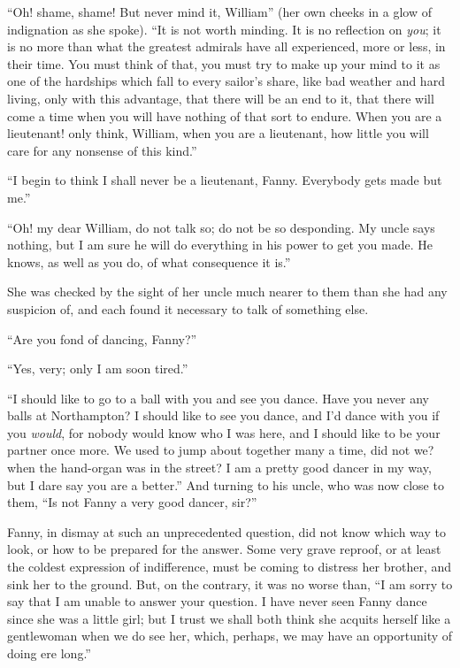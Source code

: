``Oh! shame, shame!  But never mind it, William'' (her own
cheeks in a glow of indignation as she spoke). ``It is not
worth minding.  It is no reflection on \emph{you}; it is no
more than what the greatest admirals have all experienced,
more or less, in their time.  You must think of that,
you must try to make up your mind to it as one of the
hardships which fall to every sailor's share, like bad
weather and hard living, only with this advantage,
that there will be an end to it, that there will come
a time when you will have nothing of that sort to endure.
When you are a lieutenant! only think, William, when you
are a lieutenant, how little you will care for any nonsense
of this kind.''

``I begin to think I shall never be a lieutenant, Fanny.
Everybody gets made but me.''

``Oh! my dear William, do not talk so; do not be so desponding.
My uncle says nothing, but I am sure he will do everything
in his power to get you made.  He knows, as well as you do,
of what consequence it is.''

She was checked by the sight of her uncle much nearer
to them than she had any suspicion of, and each found
it necessary to talk of something else.

``Are you fond of dancing, Fanny?''

``Yes, very; only I am soon tired.''

``I should like to go to a ball with you and see
you dance.  Have you never any balls at Northampton?
I should like to see you dance, and I'd dance with you
if you \emph{would}, for nobody would know who I was here,
and I should like to be your partner once more.
We used to jump about together many a time, did not we?
when the hand-organ was in the street?  I am a pretty
good dancer in my way, but I dare say you are a better.''
And turning to his uncle, who was now close to them,
``Is not Fanny a very good dancer, sir?''

Fanny, in dismay at such an unprecedented question,
did not know which way to look, or how to be prepared
for the answer.  Some very grave reproof, or at least
the coldest expression of indifference, must be coming
to distress her brother, and sink her to the ground.
But, on the contrary, it was no worse than, ``I am sorry
to say that I am unable to answer your question.
I have never seen Fanny dance since she was a little girl;
but I trust we shall both think she acquits herself like
a gentlewoman when we do see her, which, perhaps, we may
have an opportunity of doing ere long.''

